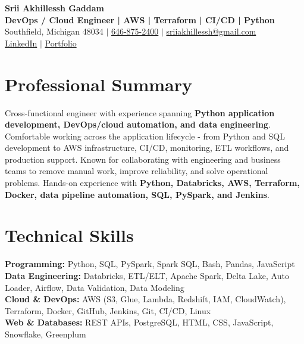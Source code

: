 \documentclass[letterpaper,10pt]{article}
\begin{document}
\fontsize{9.35pt}{10.45pt}\selectfont

\begin{center}
    {\LARGE \textbf{Srii Akhillessh Gaddam}} \\[-1pt]
    \textbf{DevOps / Cloud Engineer | AWS | Terraform | CI/CD | Python} \\[2pt]
    Southfield, Michigan 48034 $|$
    \href{tel:6468752400}{646-875-2400} $|$
    \href{mailto:sriiakhillessh@gmail.com}{sriiakhillessh@gmail.com} \\[1pt]
    \href{https://www.linkedin.com/in/srii-akhiilessh-gaddam-b48668191/}{LinkedIn} $|$
    \href{https://sriiakhillesshg.github.io/portfolio/}{Portfolio}
\end{center}
\vspace{-8pt}

\section{Professional Summary}
\small{Cross-functional engineer with experience spanning \textbf{Python application development, DevOps/cloud automation, and data engineering}. Comfortable working across the application lifecycle - from Python and SQL development to AWS infrastructure, CI/CD, monitoring, ETL workflows, and production support. Known for collaborating with engineering and business teams to remove manual work, improve reliability, and solve operational problems. Hands-on experience with \textbf{Python, Databricks, AWS, Terraform, Docker, data pipeline automation, SQL, PySpark, and Jenkins}.}

\section{Technical Skills}
\small{
\textbf{Programming:} Python, SQL, PySpark, Spark SQL, Bash, Pandas, JavaScript \\
\textbf{Data Engineering:} Databricks, ETL/ELT, Apache Spark, Delta Lake, Auto Loader, Airflow, Data Validation, Data Modeling \\
\textbf{Cloud \& DevOps:} AWS (S3, Glue, Lambda, Redshift, IAM, CloudWatch), Terraform, Docker, GitHub, Jenkins, Git, CI/CD, Linux \\
\textbf{Web \& Databases:} REST APIs, PostgreSQL, HTML, CSS, JavaScript, Snowflake, Greenplum
}
\end{document}
